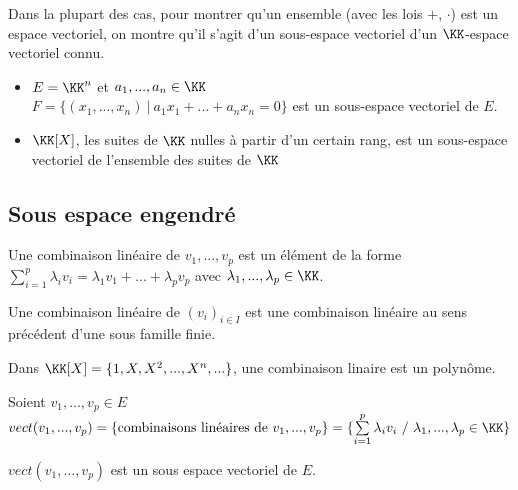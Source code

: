 \documentclass[../main.tex]{subfile}
\begin{document}
\begin{rema}
	Dans la plupart des cas, pour montrer qu'un ensemble (avec les lois $+$, $\cdot$) est un espace vectoriel, on montre qu'il s'agit d'un sous-espace vectoriel d'un $\KK$-espace vectoriel connu.
\end{rema}

\begin{ex}
\begin{itemize}	
	\item $E = \KK^n$ et $a_1, ..., a_n \in \KK$\\
	$F = \{(x_1, ..., x_n) \ | \ a_1x_1 + ... + a_nx_n = 0\}$ est un sous-espace vectoriel de $E$.
	\item $\KK[X]$, les suites de $\KK$ nulles à partir d'un certain rang, est un sous-espace vectoriel de l'ensemble des suites de $\KK$
\end{itemize}
\end{ex}

\subsection{Sous espace engendré}
\begin{defi}
	Une combinaison linéaire de $v_1, ..., v_p$ est un élément de la forme $\sum\limits_{i=1}^p \lambda_i v_i = \lambda_1 v_1 + ... + \lambda_p v_p$ avec $\lambda_1, ..., \lambda_p \in \KK$.\\
\end{defi}

\begin{rema}
	Une combinaison linéaire de $(v_i)_{i \in I}$ est une combinaison linéaire au sens précédent d'une sous famille finie.
\end{rema}

\begin{ex}
	Dans $\KK[X] = \{1, X, X^2, ..., X^n, ...\}$, une combinaison linaire est un polynôme.
\end{ex}

\begin{defi}
	Soient $v_1, ..., v_p \in E$\\
	$vect(v_1, ..., v_p) = \{\text{combinaisons linéaires de $v_1, ..., v_p$}\} = \{\sum\limits_{i=1}^p \lambda_i v_i \ / \ \lambda_1, ..., \lambda_p \in \KK\}$
\end{defi}

\begin{prop}
	$vect(v_1, ..., v_p)$ est un sous espace vectoriel de $E$.
\end{prop}
\end{document}
